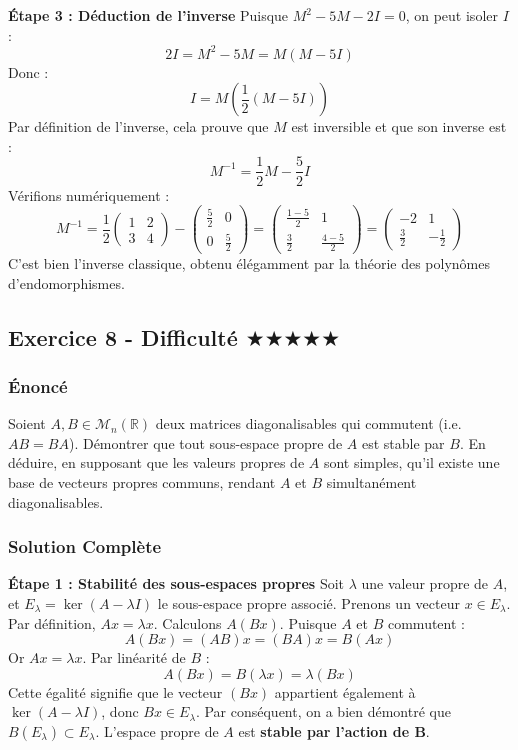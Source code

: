\documentclass[11pt,a4paper]{article}
\begin{document}
\textbf{Étape 3 : Déduction de l'inverse}
Puisque $M^2 - 5M - 2I = 0$, on peut isoler $I$ :
$$2I = M^2 - 5M = M(M - 5I)$$
Donc :
$$I = M \left( \frac{1}{2}(M - 5I) \right)$$
Par définition de l'inverse, cela prouve que $M$ est inversible et que son inverse est :
$$M^{-1} = \frac{1}{2}M - \frac{5}{2}I$$
Vérifions numériquement :
$$M^{-1} = \frac{1}{2} \begin{pmatrix} 1 & 2 \\ 3 & 4 \end{pmatrix} - \begin{pmatrix} \frac{5}{2} & 0 \\ 0 & \frac{5}{2} \end{pmatrix} = \begin{pmatrix} \frac{1-5}{2} & 1 \\ \frac{3}{2} & \frac{4-5}{2} \end{pmatrix} = \begin{pmatrix} -2 & 1 \\ \frac{3}{2} & -\frac{1}{2} \end{pmatrix}$$
C'est bien l'inverse classique, obtenu élégamment par la théorie des polynômes d'endomorphismes.


\subsection*{Exercice 8 - Difficulté \quad $\bigstar$$\bigstar$$\bigstar$$\bigstar$$\bigstar$}

\subsubsection*{Énoncé}
Soient $A, B \in \mathcal{M}_n(\mathbb{R})$ deux matrices diagonalisables qui commutent (i.e. $AB = BA$).
Démontrer que tout sous-espace propre de $A$ est stable par $B$. En déduire, en supposant que les valeurs propres de $A$ sont simples, qu'il existe une base de vecteurs propres communs, rendant $A$ et $B$ simultanément diagonalisables.

\subsubsection*{Solution Complète}

\textbf{Étape 1 : Stabilité des sous-espaces propres}
Soit $\lambda$ une valeur propre de $A$, et $E_\lambda = \ker(A - \lambda I)$ le sous-espace propre associé.
Prenons un vecteur $x \in E_\lambda$. Par définition, $Ax = \lambda x$.
Calculons $A(Bx)$. Puisque $A$ et $B$ commutent :
$$A(Bx) = (AB)x = (BA)x = B(Ax)$$
Or $Ax = \lambda x$. Par linéarité de $B$ :
$$A(Bx) = B(\lambda x) = \lambda (Bx)$$
Cette égalité signifie que le vecteur $(Bx)$ appartient également à $\ker(A - \lambda I)$, donc $Bx \in E_\lambda$.
Par conséquent, on a bien démontré que $B(E_\lambda) \subset E_\lambda$. L'espace propre de $A$ est \textbf{stable par l'action de B}.
\end{document}
